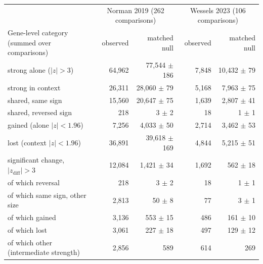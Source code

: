 \begin{tabular}{lrrrr}
\toprule
 & \multicolumn{2}{c}{Norman 2019 (262 comparisons)} & \multicolumn{2}{c}{Wessels 2023 (106 comparisons)} \\
Gene-level category (summed over comparisons) & observed & matched null & observed & matched null \\
\midrule
strong alone ($|z|>3$) & 64,962 & 77,544 $\pm$ 186 & 7,848 & 10,432 $\pm$ 79 \\
strong in context & 26,311 & 28,060 $\pm$ 79 & 5,168 & 7,963 $\pm$ 75 \\
shared, same sign & 15,560 & 20,647 $\pm$ 75 & 1,639 & 2,807 $\pm$ 41 \\
shared, reversed sign & 218 & 3 $\pm$ 2 & 18 & 1 $\pm$ 1 \\
gained (alone $|z|<1.96$) & 7,256 & 4,033 $\pm$ 50 & 2,714 & 3,462 $\pm$ 53 \\
lost (context $|z|<1.96$) & 36,891 & 39,618 $\pm$ 169 & 4,844 & 5,215 $\pm$ 51 \\
significant change, $|z_\mathrm{diff}|>3$ & 12,084 & 1,421 $\pm$ 34 & 1,692 & 562 $\pm$ 18 \\
\quad of which reversal & 218 & 3 $\pm$ 2 & 18 & 1 $\pm$ 1 \\
\quad of which same sign, other size & 2,813 & 50 $\pm$ 8 & 77 & 3 $\pm$ 1 \\
\quad of which gained & 3,136 & 553 $\pm$ 15 & 486 & 161 $\pm$ 10 \\
\quad of which lost & 3,061 & 227 $\pm$ 18 & 497 & 129 $\pm$ 12 \\
\quad of which other (intermediate strength) & 2,856 & 589 & 614 & 269 \\
\bottomrule
\end{tabular}